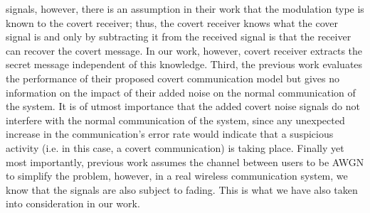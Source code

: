 signals, however, there is an assumption in their work that the modulation type is known to the covert receiver; thus, the covert receiver knows what the cover signal is and only by subtracting it from the received signal is that the receiver can recover the covert message. In our work, however, covert receiver extracts the secret message independent of this knowledge. Third, the previous work evaluates the performance of their proposed covert communication model but gives no information on the impact of their added noise on the normal communication of the system. It is of utmost importance that the added covert noise signals do not interfere with the normal communication of the system, since any unexpected increase in the communication's error rate would indicate that a suspicious activity (i.e. in this case, a covert communication) is taking place. Finally yet most importantly, previous work assumes the channel between users to be AWGN to simplify the problem, however, in a real wireless communication system, we know that the signals are also subject to fading. This is what we have also taken into consideration in our work.